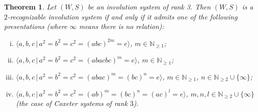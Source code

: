 \documentclass[A4paper, oneside]{amsart}
\newcommand{\N}{\mathbb{N}}
\newcommand{\id}{\textit{e}}
\newtheorem{thm}{Theorem}[section]
\theoremstyle{definition}
\begin{document}
\begin{thm}
\label{thm:rk3-reco}
    Let $(W,S)$ be an involution system of rank 3. Then $(W,S)$ is a $2$-recognizable involution system if and only if it admits one of the following presentations (where $\infty$ means there is no relation): 
    \begin{enumerate}[(i)]
        \item $\langle a,b,c \, | \, a^2=b^2=c^2 = (abc)^{2m}=\id\rangle$, $m \in \N_{\geq 1}$; \label{type1}
        
        \item $\langle a,b,c \, | \, a^2=b^2=c^2 = (abacbc)^{m}=\id \rangle$, $m \in \N_{\geq 1}$; \label{type2}
        
        \item $\langle a,b,c \, | \, a^2=b^2=c^2 = (abac)^m=(bc)^n=\id\rangle$, $m \in \N_{\geq 1}$, $n \in \N_{\geq 2} \cup \{\infty\}$; \label{type3}

        \item $\langle a,b,c \, | \, a^2=b^2=c^2 = (ab)^m=(bc)^n=(ac)^l=\id\rangle$, $m,n,l \in \N_{\geq 2} \cup \{\infty\}$ (the case of Coxeter systems of rank $3$). \label{type4}
    
    \end{enumerate}    
\end{thm}
\end{document}
